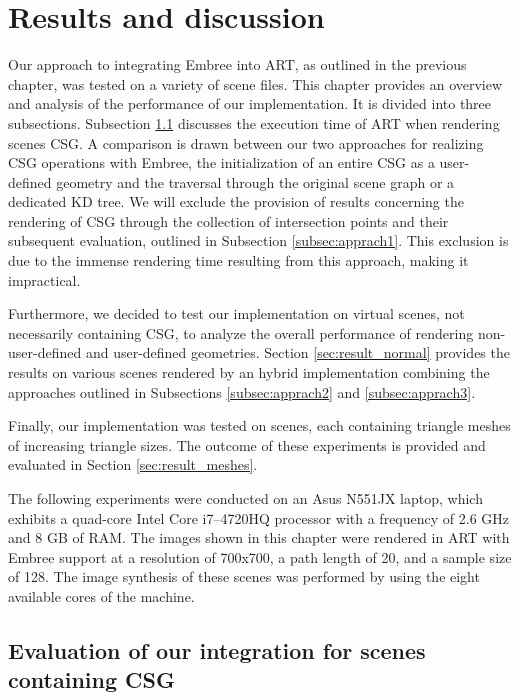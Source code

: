\chapter{Results and discussion}
\label{chap:results}

Our approach to integrating Embree into ART, as outlined in the previous chapter, was tested on a variety of scene files. This chapter provides an overview and analysis of the performance of our implementation. It is divided into three subsections. Subsection \ref{sec:results_csg} discusses the execution time of ART when rendering scenes CSG. A comparison is drawn between our two approaches for realizing CSG operations with Embree, the initialization of an entire CSG as a user-defined geometry and the traversal through the original scene graph or a dedicated KD tree. We will exclude the provision of results concerning the rendering of CSG through the collection of intersection points and their subsequent evaluation, outlined in Subsection \ref{subsec:apprach1}. This exclusion is due to the immense rendering time resulting from this approach, making it impractical.

Furthermore, we decided to test our implementation on virtual scenes, not necessarily containing CSG, to analyze the overall performance of rendering non-user-defined and user-defined geometries. Section \ref{sec:result_normal} provides the results on various scenes rendered by an hybrid implementation combining the approaches outlined in Subsections \ref{subsec:apprach2} and \ref{subsec:apprach3}. 

Finally, our implementation was tested on scenes, each containing triangle meshes of increasing triangle sizes. The outcome of these experiments is provided and evaluated in Section \ref{sec:result_meshes}.

The following experiments were conducted on an Asus N551JX laptop, which exhibits a quad-core Intel Core i7–4720HQ processor with a frequency of 2.6 GHz and 8 GB of RAM. The images shown in this chapter were rendered in ART with Embree support at a resolution of 700x700, a path length of 20, and a sample size of 128. The image synthesis of these scenes was performed by using the eight available cores of the machine.

\section{Evaluation of our integration for scenes containing CSG}
\label{sec:results_csg}

